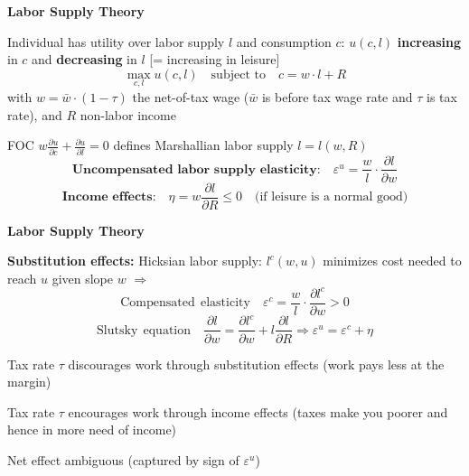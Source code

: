 \documentclass[landscape]{slides}
\begin{document}
\begin{slide}
\begin{center}
{\bf Labor Supply Theory}
\end{center}
Individual has utility over labor supply $l$ and consumption $c$: $u(c,l)$
\textbf{increasing} in $c$ and \textbf{decreasing} in $l$ [= increasing in leisure]
\[ \max_{c,l} u(c,l) \quad \text{subject to} \quad c = w \cdot l + R \]
with $w=\bar{w} \cdot (1-\tau)$ the net-of-tax wage ($\bar{w}$ is before tax wage rate and $\tau$ is tax rate), and $R$ non-labor income

FOC $w \frac{\partial u}{\partial c}+\frac{\partial u}{\partial l}=0$ defines Marshallian labor supply
$l=l(w,R)$
\[ \textbf{Uncompensated labor supply elasticity:} \quad \varepsilon^u=\frac{w}{l} \cdot \frac{\partial l}
{\partial w} \]
\[ \textbf{Income effects:} \quad \eta=w \frac{ \partial l}{\partial R} \leq 0 \quad \text{(if leisure is a normal good)}\] 


\end{slide}

\begin{slide}

\end{slide}

\begin{slide}

\end{slide}


\begin{slide}
\begin{center}
{\bf Labor Supply Theory}
\end{center}
\textbf{Substitution effects:} Hicksian labor supply: $l^c(w,u)$
minimizes cost needed to reach $u$ given slope $w$ $\Rightarrow$
\[ \mathrm{Compensated\:\:elasticity} \quad \varepsilon^c=\frac{w}{l} \cdot \frac{\partial l^c}
{\partial w} > 0  \]
\[\mathrm{Slutsky\:\:equation} \quad \frac{\partial l}{\partial w} = \frac{\partial l^c}{\partial w}
+ l \frac{ \partial l}{\partial R} \Rightarrow \varepsilon^u = \varepsilon^c + \eta\]

Tax rate $\tau$ discourages work through substitution effects (work pays less at the margin)

Tax rate $\tau$ encourages work through income effects (taxes make you poorer and hence in more need of income)

Net effect ambiguous (captured by sign of $\varepsilon^u$)

\end{slide}
\end{document}
